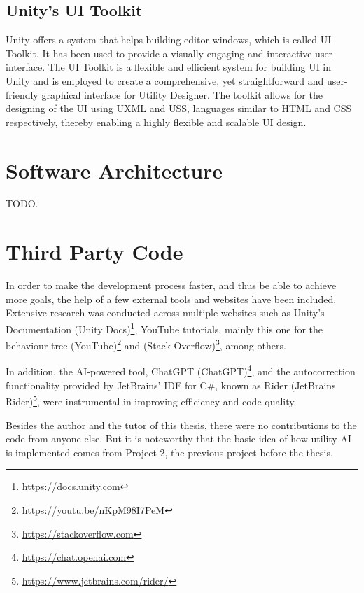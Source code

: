 \subsection{Unity's UI Toolkit}
\label{sec:implementation_uitoolkit}

Unity offers a system that helps building editor windows, which is called UI Toolkit. It has been used to provide a visually engaging and interactive user interface. The UI Toolkit is a flexible and efficient system for building UI in Unity and is employed to create a comprehensive, yet straightforward and user-friendly graphical interface for Utility Designer. The toolkit allows for the designing of the UI using UXML and USS, languages similar to HTML and CSS respectively, thereby enabling a highly flexible and scalable UI design.

\section{Software Architecture}
\label{sec:implementation_softwarearchitecture}

TODO.

\section{Third Party Code}
\label{sec:implementation_thirdpartycode}

In order to make the development process faster, and thus be able to achieve more goals, the help of a few external tools and websites have been included. Extensive research was conducted across multiple websites such as Unity's Documentation (Unity Docs)\footnote{\url{https://docs.unity.com}}, YouTube tutorials, mainly this one for the behaviour tree (YouTube)\footnote{\url{https://youtu.be/nKpM98I7PeM}} and (Stack Overflow)\footnote{\url{https://stackoverflow.com}}, among others.

In addition, the AI-powered tool, ChatGPT (ChatGPT)\footnote{\url{https://chat.openai.com}}, and the autocorrection functionality provided by JetBrains' IDE for C\#, known as Rider (JetBrains Rider)\footnote{\url{https://www.jetbrains.com/rider/}}, were instrumental in improving efficiency and code quality.

Besides the author and the tutor of this thesis, there were no contributions to the code from anyone else. But it is noteworthy that the basic idea of how utility AI is implemented comes from Project 2, the previous project before the thesis.